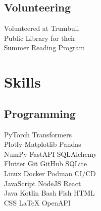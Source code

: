 \documentclass[]{resume-template}
\begin{document}
\begin{minipage}[t]{0.33\textwidth}

    \subsection{Volunteering}\label{subsec:volunteering}
    Volunteered at Trumbull \\
    Public Library for their\\
    Summer Reading Program
    \sectionsep{}



    \section{Skills}\label{sec:skills}
    \subsection{Programming}\label{subsec:programming}
    PyTorch \textbullet Transformers \textbullet{} \\
    Plotly \textbullet{} Matplotlib \textbullet{} Pandas \textbullet{}\\
    NumPy \textbullet{} FastAPI \textbullet SQLAlchemy \\
    Flutter \textbullet{} Git \textbullet{} GitHub \textbullet{} SQLite \textbullet{}\\
    Linux \textbullet Docker \textbullet Podman \textbullet {} CI/CD \\
    JavaScript \textbullet{} NodeJS \textbullet{} React \\
    Java \textbullet{} Kotlin \textbullet{} Bash \textbullet{} Fish \textbullet{} HTML \textbullet{}\\
    CSS \textbullet{} \LaTeX \textbullet{} OpenAPI
    \vspace{\topsep}

\end{minipage}
\end{document}
